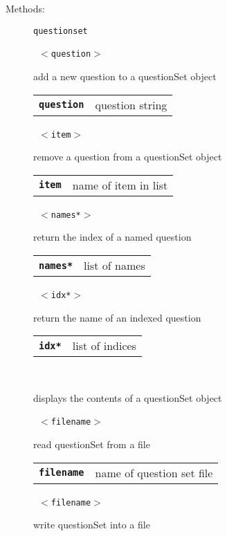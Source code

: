 \begin{description}
\vspace{3mm} \item[Methods:] \texttt{questionset}

    \begin{description}
       \texttt{ $<$question$>$} \

        add a new question to a questionSet object

      \begin{tabular}{ll}
 \texttt{\textbf{question}} &  question string  \\
      \end{tabular}
       \texttt{ $<$item$>$} \

        remove a question from a questionSet object

      \begin{tabular}{ll}
 \texttt{\textbf{item}} &  name of item in list  \\
      \end{tabular}
       \texttt{ $<$names*$>$} \

        return the index of a named question

      \begin{tabular}{ll}
 \texttt{\textbf{names*}} & list of names \\
      \end{tabular}
       \texttt{ $<$idx*$>$} \

        return the name of an indexed question

      \begin{tabular}{ll}
 \texttt{\textbf{idx*}} & list of indices \\
      \end{tabular}
       \texttt{} \

        displays the contents of a questionSet object

       \texttt{ $<$filename$>$} \

        read questionSet from a file

      \begin{tabular}{ll}
 \texttt{\textbf{filename}} &  name of question set file  \\
      \end{tabular}
       \texttt{ $<$filename$>$} \

        write questionSet into a file


\end{description}
\end{description}
